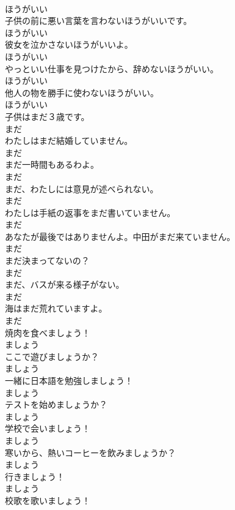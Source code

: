 \documentclass[8pt]{extreport}
\begin{document}
\begin{CJK}{UTF8}{min}
\\	ほうがいい
\\	子供の前に悪い言葉を言わないほうがいいです。	
\\	ほうがいい
\\	彼女を泣かさないほうがいいよ。	
\\	ほうがいい
\\	やっといい仕事を見つけたから、辞めないほうがいい。	
\\	ほうがいい
\\	他人の物を勝手に使わないほうがいい。	
\\	ほうがいい
\\	子供はまだ３歳です。	
\\	まだ
\\	わたしはまだ結婚していません。	
\\	まだ
\\	まだ一時間もあるわよ。	
\\	まだ
\\	まだ、わたしには意見が述べられない。	
\\	まだ
\\	わたしは手紙の返事をまだ書いていません。	
\\	まだ
\\	あなたが最後ではありませんよ。中田がまだ来ていません。	
\\	まだ
\\	まだ決まってないの？	
\\	まだ
\\	まだ、バスが来る様子がない。	
\\	まだ
\\	海はまだ荒れていますよ。	
\\	まだ
\\	焼肉を食べましょう！	
\\	ましょう
\\	ここで遊びましょうか？	
\\	ましょう
\\	一緒に日本語を勉強しましょう！	
\\	ましょう
\\	テストを始めましょうか？	
\\	ましょう
\\	学校で会いましょう！	
\\	ましょう
\\	寒いから、熱いコーヒーを飲みましょうか？	
\\	ましょう
\\	行きましょう！	
\\	ましょう
\\	校歌を歌いましょう！	

\end{CJK}
\end{document}
